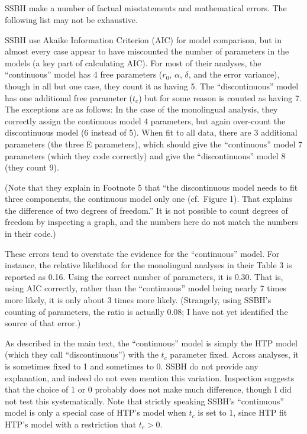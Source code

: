 \documentclass[
  english,
  doc,floatsintext]{apa6}
\begin{document}
\clearpage



\begin{appendix}
\section{}
SSBH make a number of factual misstatements and mathematical errors. The
following list may not be exhaustive.

SSBH use Akaike Information Criterion (AIC) for model comparison, but in
almost every case appear to have miscounted the number of parameters in
the models (a key part of calculating AIC). For most of their analyses,
the ``continuous'' model has 4 free parameters (\(r_0\), \(\alpha\),
\(\delta\), and the error variance), though in all but one case, they
count it as having 5. The ``discontinuous'' model has one additional
free parameter (\(t_c\)) but for some reason is counted as having 7. The
exceptions are as follows: In the case of the monolingual analysis, they
correctly assign the continuous model 4 parameters, but again over-count
the discontinuous model (6 instead of 5). When fit to all data, there
are 3 additional parameters (the three E parameters), which should give
the ``continuous'' model 7 parameters (which they code correctly) and
give the ``discontinuous'' model 8 (they count 9).

(Note that they explain in Footnote 5 that ``the discontinuous model
needs to fit three components, the continuous model only one (cf.~Figure
1). That explains the difference of two degrees of freedom.'' It is not
possible to count degrees of freedom by inspecting a graph, and the
numbers here do not match the numbers in their code.)

These errors tend to overstate the evidence for the ``continuous''
model. For instance, the relative likelihood for the monolingual
analyses in their Table 3 is reported as 0.16. Using the correct number
of parameters, it is 0.30. That is, using AIC correctly, rather than the
``continuous'' model being nearly 7 times more likely, it is only about
3 times more likely. (Strangely, using SSBH's counting of parameters,
the ratio is actually 0.08; I have not yet identified the source of that
error.)

As described in the main text, the ``continuous'' model is simply the
HTP model (which they call ``discontinuous'') with the \(t_c\) parameter
fixed. Across analyses, it is sometimes fixed to 1 and sometimes to 0.
SSBH do not provide any explanation, and indeed do not even mention this
variation. Inspection suggests that the choice of 1 or 0 probably does
not make much difference, though I did not test this systematically.
Note that strictly speaking SSBH's ``continuous'' model is only a
special case of HTP's model when \(t_c\) is set to 1, since HTP fit
HTP's model with a restriction that \(t_c > 0\).


\end{appendix}
\end{document}
